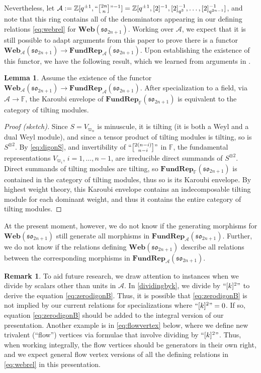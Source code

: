 \documentclass[10pt]{amsart}
\numberwithin{equation}{section}
\theoremstyle{definition}
\newtheorem{lem}[thm]{Lemma}
\newtheorem{rem}[thm]{Remark}
\def\Z{{\mathbb Z}}
\newcommand{\son}[1][2n+1]{\mathfrak{so}_{#1}}
\newcommand{\FRep}{\mathbf{FundRep}}
\newcommand{\Web}{\mathbf{Web}}
\begin{document}
Nevertheless, let $\mathcal{A}:=\Z[q^{\pm 1},``{2n \brack n}"^{-1}] 
= \mathbb{Z}[q^{\pm 1}, [2]^{-1}, [2]_{q^3}^{-1}, \dots, [2]_{q^{2n-1}}^{-1}]$,
and note that this ring contains all of the denominators 
appearing in our defining relations \eqref{eq:webrel} for $\Web(\son)$. 
Working over $\mathcal{A}$, 
we expect that it is still possible to adapt arguments from this paper to prove there is a functor 
$\Web_{\mathcal{A}}(\son)\rightarrow \FRep_{\mathcal{A}}(\son)$. 
Upon establishing the existence of this functor, 
we have the following result, 
which we learned from arguments in \cite[Section 3.6.2]{JMWParityTilting}. 

\begin{lem}
Assume the existence of the functor $\Web_{\mathcal{A}}(\son)\rightarrow \FRep_{\mathcal{A}}(\son)$.
After specialization to a field, via $\mathcal{A}\rightarrow \mathbb{F}$, 
the Karoubi envelope of $\FRep_{\mathbb{F}}(\son)$ is equivalent to the category of tilting modules.
\end{lem}

\begin{proof}[Proof (sketch)]
Since $S=V_{\varpi_n}$ is minuscule, it is tilting (it is both a Weyl and a dual Weyl module), 
and since a tensor product of tilting modules is tilting, so is $S^{\otimes 2}$. 
By \eqref{eq:digonS}, and invertibility of $``{2(n-i) \brack n-i}"$ in $\mathbb{F}$, 
the fundamental representations $V_{\varpi_i}$, 
$i=1, \dots, n-1$, are irreducible direct summands of $S^{\otimes 2}$. 
Direct summands of tilting modules are tilting, 
so $\FRep_{\mathbb{F}}(\son)$ is contained in the category of tilting modules, thus so is its Karoubi envelope. 
By highest weight theory, this Karoubi envelope contains 
an indecomposable tilting module for each dominant weight, 
and thus it contains the entire category of tilting modules. \end{proof}

At the present moment, however,
we do not know if the generating morphisms for $\Web(\son)$ 
still generate all morphisms in $\FRep_{\mathcal{A}}(\son)$.
Further, we do not know if the relations defining $\Web(\son)$ 
describe all relations between the corresponding morphisms in $\FRep_{\mathcal{A}}(\son)$. 

\begin{rem}\label{rem:integralform}
To aid future research, we draw attention to instances when 
we divide by scalars other than units in $\mathcal{A}$. 
In \eqref{dividingbyk}, we divide by $``[k]^2"$ to derive the equation \eqref{eq:zerodigonB}.
Thus, it is possible that \eqref{eq:zerodigonB} is not implied by our current relations 
for specializations where  $``[k]^2"=0$. 
If so, equation \eqref{eq:zerodigonB} should be added to the integral version of our presentation. 
Another example is in \eqref{eq:flowvertex} below, 
where we define new trivalent (``flow'') vertices via formulae that involve dividing by $``[k]^2"$. 
Thus, when working integrally, the flow vertices should be generators in their own right, 
and we expect general flow vertex versions of all the defining relations in \eqref{eq:webrel} 
in this presentation.
\end{rem}
\end{document}
